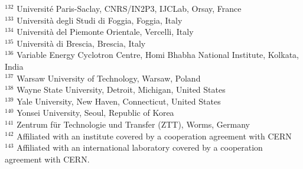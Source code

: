 \begin{flushleft}
$^{132}$ Universit\'{e}  Paris-Saclay, CNRS/IN2P3, IJCLab, Orsay, France\\
$^{133}$ Universit\`{a} degli Studi di Foggia, Foggia, Italy\\
$^{134}$ Universit\`{a} del Piemonte Orientale, Vercelli, Italy\\
$^{135}$ Universit\`{a} di Brescia, Brescia, Italy\\
$^{136}$ Variable Energy Cyclotron Centre, Homi Bhabha National Institute, Kolkata, India\\
$^{137}$ Warsaw University of Technology, Warsaw, Poland\\
$^{138}$ Wayne State University, Detroit, Michigan, United States\\
$^{139}$ Yale University, New Haven, Connecticut, United States\\
$^{140}$ Yonsei University, Seoul, Republic of Korea\\
$^{141}$  Zentrum  f\"{u}r Technologie und Transfer (ZTT), Worms, Germany\\
$^{142}$ Affiliated with an institute covered by a cooperation agreement with CERN\\
$^{143}$ Affiliated with an international laboratory covered by a cooperation agreement with CERN.\\



\end{flushleft} 
